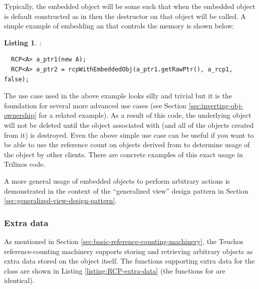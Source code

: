 \documentclass[pdf,ps2pdf,11pt]{SANDreport}
\newtheorem{listing}{Listing}
\begin{document}
Typically, the embedded object will be some {} such that
when the embedded object is default constructed as in
{} then the destructor on that object
will be called.  A simple example of embedding an {} that
controls the memory is shown below:

\begin{listing}: \\
{\small\begin{verbatim}
  RCP<A> a_ptr1(new A);
  RCP<A> a_ptr2 = rcpWithEmbeddedObj(a_ptr1.getRawPtr(), a_rcp1, false);
\end{verbatim}}
\end{listing}

The use case used in the above example looks silly and trivial but it
is the foundation for several more advanced use cases (see Section
{}\ref{sec:inverting-obj-ownership} for a related example).  As a
result of this code, the underlying {} object will not be
deleted until the {} object associated with
{} (and all of the {} objects created from
it) is destroyed.  Even the above simple use case can be useful if you
want to be able to use the reference count on {} objects
derived from {} to determine usage of the object by
other clients.  There are concrete examples of this exact usage in
Trilinos code.

A more general usage of embedded objects to perform arbitrary actions
is demonstrated in the context of the ``generalized view'' design
pattern in Section {}\ref{sec:generalized-view-design-pattern}.


%
{}\subsubsection{Extra data}
\label{sec:extra-data}
%

As mentioned in Section
{}\ref{sec:basic-reference-counting-machinery}, the Teuchos
reference-counting machinery supports storing and retrieving arbitrary
objects as extra data stored on the {} object itself.
The functions supporting extra data for the {} class are
shown in Listing {}\ref{listing:RCP-extra-data} (the functions for
{} are identical).
\end{document}
